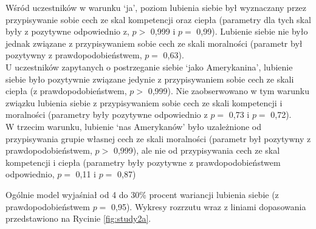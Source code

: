 \documentclass[man]{apa6}
\begin{document}
Wśród uczestników w warunku `ja', poziom lubienia siebie był wyznaczany przez przypisywanie sobie cech ze skal kompetencji oraz ciepła (parametry dla tych skal były z pozytywne odpowiednio z, $p > $ 0,999 i $p = $ 0,99). Lubienie siebie nie było jednak związane z przypisywaniem sobie cech ze skali moralności (parametr był pozytywny z prawdopodobieństwem, $p = $ 0,63). \\

U uczestników zapytanych o postrzeganie siebie `jako Amerykanina', lubienie siebie było pozytywnie związane jedynie z przypisywaniem sobie cech ze skali ciepła (z prawdopodobieństwem, $p >$ 0,999). Nie zaobserwowano w tym warunku związku lubienia siebie z przypisywaniem sobie cech ze skali kompetencji i moralności (parametry były pozytywne odpowiednio z $p =$  0,73 i $p =$ 0,72).\\

W trzecim warunku, lubienie `nas Amerykanów' było uzależnione od przypisywania grupie własnej cech ze skali moralności (parametr był pozytywny z prawdopodobieństwem, $p >$ 0,999), ale nie od przypisywania cech ze skal kompetencji i ciepła (parametry były pozytywne z prawdopodobieństwem odpowiednio, $p =$ 0,11 i $p =$ 0,87)

Ogólnie model wyjaśniał od 4 do 30\% procent wariancji lubienia siebie (z prawdopodobieństwem $p =$ 0,95). Wykresy rozrzutu wraz z liniami dopasowania przedstawiono na Rycinie \ref{fig:study2a}.\\
\end{document}
